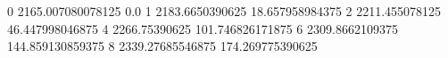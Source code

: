 0 2165.007080078125 0.0
1 2183.6650390625 18.657958984375
2 2211.455078125 46.447998046875
4 2266.75390625 101.746826171875
6 2309.8662109375 144.859130859375
8 2339.27685546875 174.269775390625
